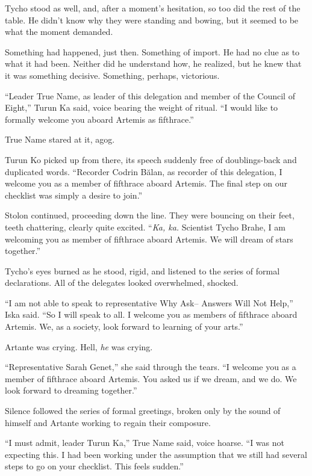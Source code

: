 Tycho stood as well, and, after a moment's hesitation, so too did the rest of the table. He didn't know why they were standing and bowing, but it seemed to be what the moment demanded.

Something had happened, just then. Something of import. He had no clue as to what it had been. Neither did he understand how, he realized, but he knew that it was something decisive. Something, perhaps, victorious.

``Leader True Name, as leader of this delegation and member of the Council of Eight,'' Turun Ka said, voice bearing the weight of ritual. ``I would like to formally welcome you aboard Artemis as fifthrace.''

True Name stared at it, agog.

Turun Ko picked up from there, its speech suddenly free of doublings-back and duplicated words. ``Recorder Codrin Bălan, as recorder of this delegation, I welcome you as a member of fifthrace aboard Artemis. The final step on our checklist was simply a desire to join.''

Stolon continued, proceeding down the line. They were bouncing on their feet, teeth chattering, clearly quite excited. ``\emph{Ka, ka.} Scientist Tycho Brahe, I am welcoming you as member of fifthrace aboard Artemis. We will dream of stars together.''

Tycho's eyes burned as he stood, rigid, and listened to the series of formal declarations. All of the delegates looked overwhelmed, shocked.

``I am not able to speak to representative Why Ask-- Answers Will Not Help,'' Iska said. ``So I will speak to all. I welcome you as members of fifthrace aboard Artemis. We, as a society, look forward to learning of your arts.''

Artante was crying. Hell, \emph{he} was crying.

``Representative Sarah Genet,'' she said through the tears. ``I welcome you as a member of fifthrace aboard Artemis. You asked us if we dream, and we do. We look forward to dreaming together.''

Silence followed the series of formal greetings, broken only by the sound of himself and Artante working to regain their composure.

``I must admit, leader Turun Ka,'' True Name said, voice hoarse. ``I was not expecting this. I had been working under the assumption that we still had several steps to go on your checklist. This feels sudden.''

